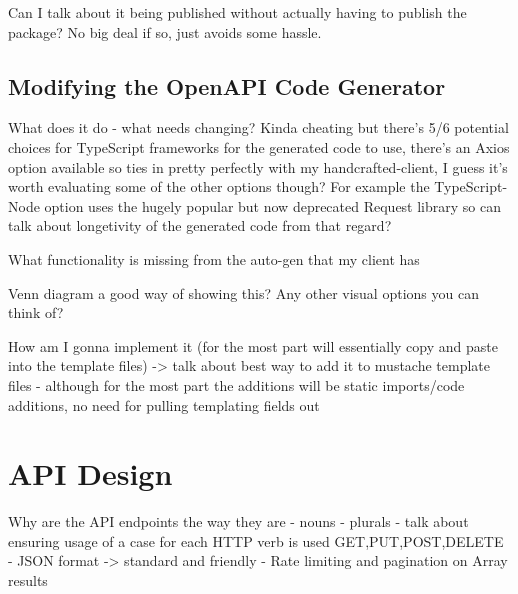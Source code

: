 Can I talk about it being published without actually having to publish the package? No big deal if so, just avoids some hassle.

\subsection{Modifying the OpenAPI Code Generator}

What does it do - what needs changing? Kinda cheating but there's 5/6 potential choices for TypeScript frameworks for the generated code to use, there's an Axios option available so ties in pretty perfectly with my handcrafted-client, I guess it's worth evaluating some of the other options though? For example the TypeScript-Node option uses the hugely popular but now deprecated Request library so can talk about longetivity of the generated code from that regard?

What functionality is missing from the auto-gen that my client has

Venn diagram a good way of showing this? Any other visual options you can think of?

How am I gonna implement it (for the most part will essentially copy and paste into the template files) -> talk about best way to add it to mustache template files - although for the most part the additions will be static imports/code additions, no need for pulling templating fields out



\section{API Design}
Why are the API endpoints the way they are
- nouns
- plurals
- talk about ensuring usage of a case for each HTTP verb is used GET,PUT,POST,DELETE
- JSON format -> standard and friendly
- Rate limiting and pagination on Array results